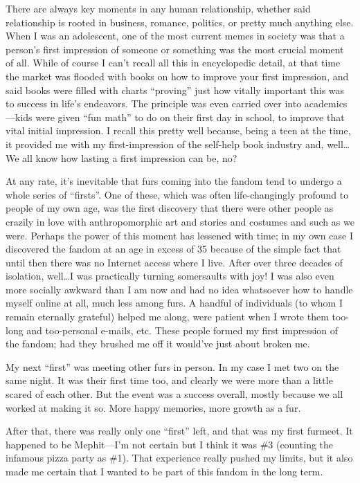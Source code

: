 
There are always key moments in any human relationship, whether said relationship is rooted in business, romance, politics, or pretty much anything else. When I was an adolescent, one of the most current memes in society was that a person's first impression of someone or something was the most crucial moment of all. While of course I can't recall all this in encyclopedic detail, at that time the market was flooded with books on how to improve your first impression, and said books were filled with charts ``proving'' just how vitally important this was to success in life's endeavors. The principle was even carried over into academics—kids were given ``fun math'' to do on their first day in school, to improve that vital initial impression. I recall this pretty well because, being a teen at the time, it provided me with my first-impression of the self-help book industry and, well\ldots We all know how lasting a first impression can be, no?

At any rate, it's inevitable that furs coming into the fandom tend to undergo a whole series of ``firsts''. One of these, which was often life-changingly profound to people of my own age, was the first discovery that there were other people as crazily in love with anthropomorphic art and stories and costumes and such as we were. Perhaps the power of this moment has lessened with time; in my own case I discovered the fandom at an age in excess of 35 because of the simple fact that until then there was no Internet access where I live. After over three decades of isolation, well\ldots I was practically turning somersaults with joy! I was also even more socially awkward than I am now and had no idea whatsoever how to handle myself online at all, much less among furs. A handful of individuals (to whom I remain eternally grateful) helped me along, were patient when I wrote them too-long and too-personal e-mails, etc. These people formed my first impression of the fandom; had they brushed me off it would've just about broken me.

My next ``first'' was meeting other furs in person. In my case I met two on the same night. It was their first time too, and clearly we were more than a little scared of each other. But the event was a success overall, mostly because we all worked at making it so. More happy memories, more growth as a fur.

After that, there was really only one ``first'' left, and that was my first furmeet. It happened to be Mephit—I'm not certain but I think it was \#3 (counting the infamous pizza party as \#1). That experience really pushed my limits, but it also made me certain that I wanted to be part of this fandom in the long term.

